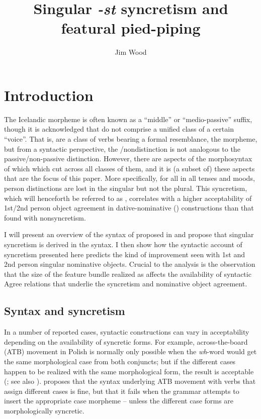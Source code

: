 \documentclass[output=paper]{langscibook}
\author{Jim Wood\affiliation{Yale University}}
\title{Singular \textit{-st} syncretism and featural pied-piping}
\begin{document}
\maketitle

\section{Introduction}\label{woodsecexs}

The Icelandic \sti morpheme is often known as a “middle” or “medio-passive” suffix, though it is acknowledged that \stvs do not comprise a unified class of a certain “voice”. That is, \stvs are a class of verbs bearing a formal resemblance, the \sti morpheme, but from a syntactic perspective, the \stin/non\sti distinction is not analogous to the passive\slash non-passive distinction.  However, there are aspects of the morphosyntax of \stvs which which cut across all classes of them, and it is (a subset of) these aspects that are the focus of this paper. More specifically, for all \stvs in all tenses and moods, person distinctions are lost in the singular but not the plural. This syncretism, which will henceforth be referred to as , correlates with a higher acceptability of 1st/2nd person object agreement in dative-nominative (\datnomn) constructions than that found with non\sti syncretism.  

I will present an overview of the syntax of \sti proposed in  \citet{wood:refl,Wood2015book} and propose that singular \sti syncretism is derived in the syntax. I then show how the syntactic account of \sti syncretism presented here predicts the kind of improvement seen with 1st and 2nd person singular nominative objects. Crucial to the analysis is the observation that the size of the feature bundle realized as \sti affects the availability of syntactic Agree relations that underlie the syncretism and nominative object agreement. 


\subsection{Syntax and syncretism} 

In a number of reported cases, syntactic constructions can vary in acceptability depending on the availability of syncretic forms. For example, across-the-board (ATB)  movement in Polish is normally only possible when the \textit{wh}-word would get the same morphological case from both conjuncts; but if the different cases happen to be realized with the same morphological form, the result is acceptable (\citealt{citko2005nature,hein2020case}; see also \citealt[fn2]{Ximenes:2007vs}). \citet{citko2005nature} proposes that the syntax underlying ATB movement with verbs that assign different cases is fine, but that it fails when the grammar attempts to insert the appropriate case morpheme -- unless the different case forms are morphologically syncretic. 
\end{document}
